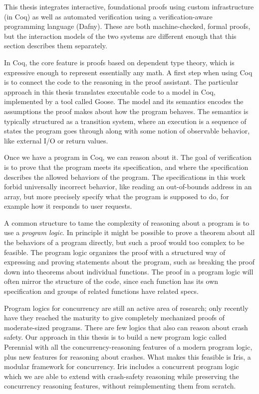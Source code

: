 This thesis integrates interactive, foundational proofs using custom
infrastructure (in Coq) as well as automated verification using a
verification-aware programming language (Dafny). These are both machine-checked,
formal proofs, but the interaction models of the two systems are different
enough that this section describes them separately.

In Coq, the core feature is proofs based on dependent type theory, which is
expressive enough to represent essentially any math. A first step when using Coq
is to connect the code to the reasoning in the proof assistant. The particular
approach in this thesis translates executable code to a model in Coq,
implemented by a tool called Goose. The model
and its semantics encodes the
assumptions the proof makes about how the program behaves. The semantics is typically structured as a transition
system, where an execution is a sequence of states the program goes through
along with some notion of observable behavior, like external I/O or return
values. 

Once we have a program in Coq, we can reason about it. The goal of
verification is to prove that the program meets its specification, and
where the specification describes the allowed behaviors of the program. The
specifications in this work forbid universally incorrect behavior, like reading an
out-of-bounds address in an array, but more precisely specify what the program
is supposed to do, for example how it responds to user requests.

A common structure to tame the complexity of reasoning about a program is to use
a \emph{program logic}. In principle it might be possible to prove a theorem
about all the behaviors of a program directly, but such a proof would too
complex to be feasible. The program logic organizes the proof with a structured
way of expressing and proving statements about the program, such as breaking the
proof down into theorems about individual functions. The proof in a program
logic will often mirror the structure of the code, since each function has its
own specification and groups of related functions have related specs.

Program logics for concurrency are still an active area of research; only
recently have they reached the maturity to give completely mechanized proofs of
moderate-sized programs. There are few logics that also can reason about crash
safety. Our approach in this thesis is to build a new program logic called Perennial with all the
concurrency-reasoning features of a modern program logic, plus new features for
reasoning about crashes. What makes this feasible is Iris, a modular framework
for concurrency. Iris includes a concurrent program logic which we are able to
extend with crash-safety reasoning while preserving the concurrency reasoning
features, without reimplementing them from scratch.


